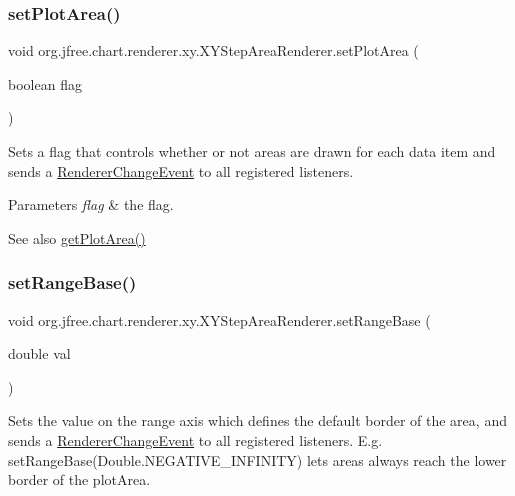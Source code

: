 \subsubsection{\texorpdfstring{set\+Plot\+Area()}{setPlotArea()}}
{\footnotesize\ttfamily void org.\+jfree.\+chart.\+renderer.\+xy.\+X\+Y\+Step\+Area\+Renderer.\+set\+Plot\+Area (\begin{DoxyParamCaption}\item[{boolean}]{flag }\end{DoxyParamCaption})}

Sets a flag that controls whether or not areas are drawn for each data item and sends a \mbox{\hyperlink{}{Renderer\+Change\+Event}} to all registered listeners.


\begin{DoxyParams}{Parameters}
{\em flag} & the flag.\\
\hline
\end{DoxyParams}
\begin{DoxySeeAlso}{See also}
\mbox{\hyperlink{classorg_1_1jfree_1_1chart_1_1renderer_1_1xy_1_1_x_y_step_area_renderer_ac362b49cce6ba1ec752730bdfb11c590}{get\+Plot\+Area()}} 
\end{DoxySeeAlso}
\mbox{\label{classorg_1_1jfree_1_1chart_1_1renderer_1_1xy_1_1_x_y_step_area_renderer_ada3dfcb79ef9abbbf17d2488e3fdfa31}} 
\subsubsection{\texorpdfstring{set\+Range\+Base()}{setRangeBase()}}
{\footnotesize\ttfamily void org.\+jfree.\+chart.\+renderer.\+xy.\+X\+Y\+Step\+Area\+Renderer.\+set\+Range\+Base (\begin{DoxyParamCaption}\item[{double}]{val }\end{DoxyParamCaption})}

Sets the value on the range axis which defines the default border of the area, and sends a \mbox{\hyperlink{}{Renderer\+Change\+Event}} to all registered listeners. E.\+g. set\+Range\+Base(Double.\+N\+E\+G\+A\+T\+I\+V\+E\+\_\+\+I\+N\+F\+I\+N\+I\+TY) lets areas always reach the lower border of the plot\+Area.


